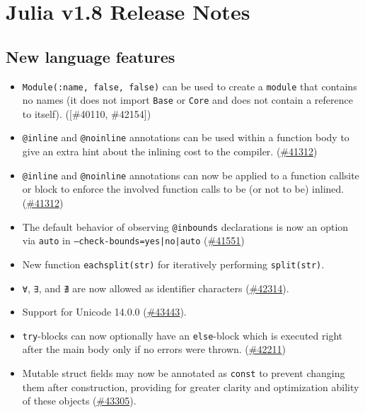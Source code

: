 
\part{Julia v1.8 Release Notes}



\hypertarget{190991524886526400}{}


\chapter{New language features}



\begin{itemize}
\item \texttt{Module(:name, false, false)} can be used to create a \texttt{module} that contains no names (it does not import \texttt{Base} or \texttt{Core} and does not contain a reference to itself). ([\#40110, \#42154])


\item \texttt{@inline} and \texttt{@noinline} annotations can be used within a function body to give an extra hint about the inlining cost to the compiler. (\href{https://github.com/JuliaLang/julia/issues/41312}{\#41312})


\item \texttt{@inline} and \texttt{@noinline} annotations can now be applied to a function callsite or block to enforce the involved function calls to be (or not to be) inlined. (\href{https://github.com/JuliaLang/julia/issues/41312}{\#41312})


\item The default behavior of observing \texttt{@inbounds} declarations is now an option via \texttt{auto} in \texttt{--check-bounds=yes|no|auto} (\href{https://github.com/JuliaLang/julia/issues/41551}{\#41551})


\item New function \texttt{eachsplit(str)} for iteratively performing \texttt{split(str)}.


\item \texttt{∀}, \texttt{∃}, and \texttt{∄} are now allowed as identifier characters (\href{https://github.com/JuliaLang/julia/issues/42314}{\#42314}).


\item Support for Unicode 14.0.0 (\href{https://github.com/JuliaLang/julia/issues/43443}{\#43443}).


\item \texttt{try}-blocks can now optionally have an \texttt{else}-block which is executed right after the main body only if no errors were thrown. (\href{https://github.com/JuliaLang/julia/issues/42211}{\#42211})


\item Mutable struct fields may now be annotated as \texttt{const} to prevent changing them after construction, providing for greater clarity and optimization ability of these objects (\href{https://github.com/JuliaLang/julia/issues/43305}{\#43305}).

\end{itemize}


